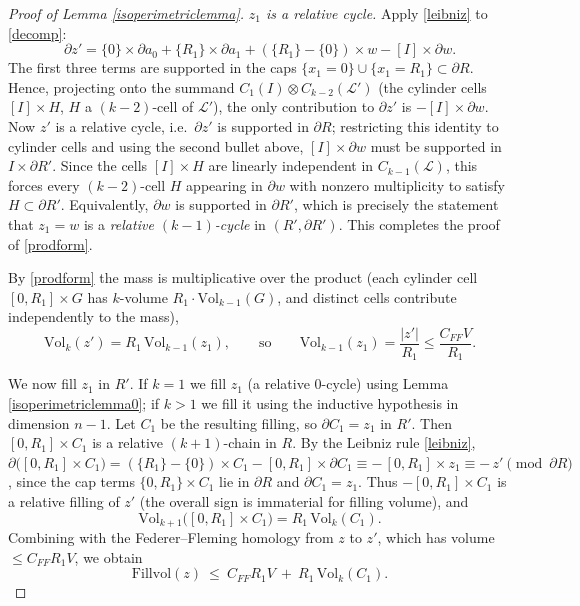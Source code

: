 \documentclass{amsart}
\newtheorem*{theorem 1}{Theorem 1}
\newtheorem*{theorem 2}{Theorem 2}
\newtheorem*{theorem 3}{Theorem 3}
\numberwithin{equation}{section}
\newcommand{\Vol}{\textrm{Vol}}
\begin{document}
\begin{proof} [Proof of Lemma \ref{isoperimetriclemma}]
\medskip
\noindent\emph{$z_1$ is a relative cycle.}
Apply \eqref{leibniz} to \eqref{decomp}:
$$ \partial z'
   = \{0\}\times\partial a_0
   + \{R_1\}\times\partial a_1
   + (\{R_1\}-\{0\})\times w
   - [I]\times\partial w. $$
The first three terms are supported in the caps $\{x_1=0\}\cup
\{x_1=R_1\}\subset\partial R$.  Hence, projecting onto the
summand $C_1(I)\otimes C_{k-2}(\mathcal L')$ (the cylinder cells
$[I]\times H$, $H$ a $(k-2)$-cell of $\mathcal{L}'$), the only
contribution to $\partial z'$ is $-[I]\times\partial w$.  Now $z'$
is a relative cycle, i.e.\ $\partial z'$ is supported in
$\partial R$; restricting this identity to cylinder cells and using
the second bullet above, $[I]\times\partial w$ must be supported in
$I\times\partial R'$.  Since the cells $[I]\times H$ are linearly
independent in $C_{k-1}(\mathcal L)$, this forces every $(k-2)$-cell
$H$ appearing in $\partial w$ with nonzero multiplicity to satisfy
$H\subset\partial R'$.  Equivalently, $\partial w$ is supported in
$\partial R'$, which is precisely the statement that $z_1=w$ is a
\emph{relative $(k-1)$-cycle} in $(R',\partial R')$.  This completes
the proof of \eqref{prodform}.

\medskip
By \eqref{prodform} the mass is multiplicative over the product
(each cylinder cell $[0,R_1]\times G$ has $k$-volume $R_1\cdot
\Vol_{k-1}(G)$, and distinct cells contribute independently to the
mass),
$$ \Vol_k(z') = R_1\, \Vol_{k-1}(z_1), \qquad\text{so}\qquad
   \Vol_{k-1}(z_1) = \frac{|z'|}{R_1} \le \frac{C_{FF} V}{R_1}. $$

We now fill $z_1$ in $R'$.  If $k = 1$ we fill $z_1$ (a relative
$0$-cycle) using Lemma \ref{isoperimetriclemma0}; if $k > 1$ we
fill it using the inductive hypothesis in dimension $n-1$.  Let
$C_1$ be the resulting filling, so $\partial C_1 = z_1$ in $R'$.
Then $[0,R_1] \times C_1$ is a relative $(k+1)$-chain in $R$.
By the Leibniz rule \eqref{leibniz},
$\partial\big([0,R_1]\times C_1\big)
 = (\{R_1\}-\{0\})\times C_1 - [0,R_1]\times\partial C_1
 \equiv -\,[0,R_1]\times z_1 \equiv -\,z' \pmod{\partial R}$,
since the cap terms $\{0,R_1\}\times C_1$ lie in $\partial R$ and
$\partial C_1 = z_1$.  Thus $-[0,R_1]\times C_1$ is a relative
filling of $z'$ (the overall sign is immaterial for filling
volume), and
$$ \Vol_{k+1}\big([0,R_1]\times C_1\big) = R_1\,\Vol_k(C_1). $$
Combining with the Federer--Fleming homology from $z$ to $z'$,
which has volume $\le C_{FF} R_1 V$, we obtain
\begin{equation} \label{fill-z}
 \mathrm{Fillvol}(z) \ \le\ C_{FF} R_1 V \ +\ R_1\,\Vol_k(C_1).
\end{equation}


\end{proof}
\end{document}
